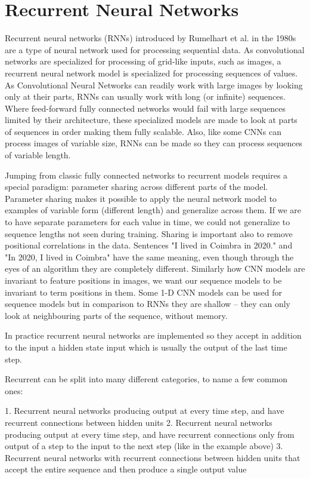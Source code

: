 \documentclass[b5paper]{book}
\begin{document}
\section{Recurrent Neural Networks}

Recurrent neural networks (RNNs) introduced by Rumelhart et al. in the 1980s are a type of neural network used for processing sequential data. As convolutional networks are specialized for processing of grid-like inputs, such as images, a recurrent neural network model is specialized for processing sequences of values. As Convolutional Neural Networks can readily work with large images by looking only at their parts, RNNs can usually work with long (or infinite) sequences. Where feed-forward fully connected networks would fail with large sequences limited by their architecture, these specialized models are made to look at parts of sequences in order making them fully scalable. Also, like some CNNs can process images of variable size, RNNs can be made so they can process sequences of variable length.

Jumping from classic fully connected networks to recurrent models requires a special paradigm: parameter sharing across different parts of the model. Parameter sharing makes it possible to apply the neural network model to examples of variable form (different length) and generalize across them. If we are to have separate parameters for each value in time, we could not generalize to sequence lengths not seen during training. Sharing is important also to remove positional correlations in the data. Sentences "I lived in Coimbra in 2020." and "In 2020, I lived in Coimbra" have the same meaning, even though through the eyes of an algorithm they are completely different. Similarly how CNN models are invariant to feature positions in images, we want our sequence models to be invariant to term positions in them. Some 1-D CNN models can be used for sequence models but in comparison to RNNs they are shallow -- they can only look at neighbouring parts of the sequence, without memory.

In practice recurrent neural networks are implemented so they accept in addition to the input a hidden state input which is usually the output of the last time step.

Recurrent can be split into many different categories, to name a few common ones:

1. Recurrent neural networks producing output at every time step, and have recurrent connections between hidden units
2. Recurrent neural networks producing output at every time step, and have recurrent connections only from output of a step to the input to the next step (like in the example above)
3. Recurrent neural networks with recurrent connections between hidden units that accept the entire sequence and then produce a single output value
\end{document}
